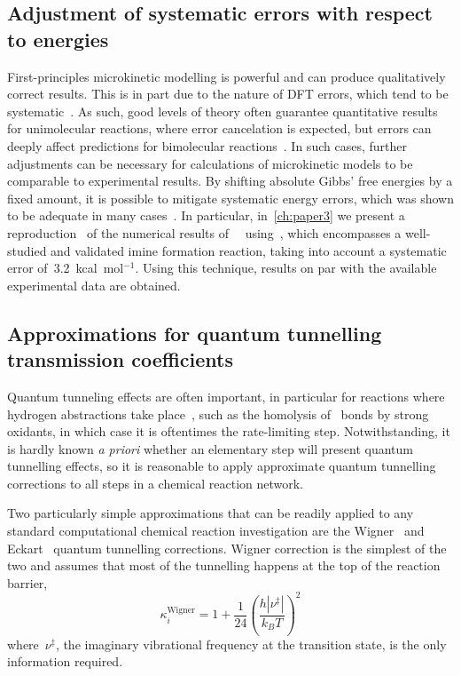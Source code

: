 \subsection{Adjustment of systematic errors with respect to energies}%
\label{sec:rates-error-prop-adj}

First-principles microkinetic modelling is powerful and can produce qualitatively correct results.
This is in part due to the nature of DFT errors,
which tend to be systematic~\cite{P_rez_Soto_2020}.
As such,
good levels of theory often guarantee quantitative results for unimolecular reactions,
where error cancelation is expected,
but errors can deeply affect predictions for bimolecular reactions~\cite{P_rez_Soto_2020}.
In such cases,
further adjustments can be necessary for calculations of microkinetic models to be comparable to experimental results.
By shifting absolute Gibbs' free energies by a fixed amount,
it is possible to mitigate systematic energy errors,
which was shown to be adequate in many cases~\cite{Ahn_2019,P_rez_Soto_2020}.
In particular,
in~\cref{ch:paper3} we present a reproduction~\cite{Schneider_2022} of the numerical results
of~\citeauthor{P_rez_Soto_2020}~\cite{P_rez_Soto_2020} using~\overreact{},
which encompasses a well-studied and validated imine formation reaction,
taking into account a systematic error of~3.2~kcal~mol$^{-1}$.
Using this technique,
results on par with the available experimental data are obtained.

\subsection{Approximations for quantum tunnelling transmission coefficients}%
\label{sec:tunneling}

Quantum tunneling effects are often important,
in particular for reactions where
hydrogen abstractions take place~\cite{Bim2018},
such as the homolysis of~ bonds by strong
oxidants,
in which case it is oftentimes the rate-limiting step.
Notwithstanding,
it is hardly known \emph{a priori} whether an elementary step
will present quantum tunnelling effects,
so it is reasonable to apply approximate quantum tunnelling corrections to all steps in a chemical reaction network.

Two particularly simple approximations that can be readily applied to any standard computational chemical reaction investigation
are the Wigner~\cite{Wigner_1932} and Eckart~\cite{Eckart_1930} quantum tunnelling corrections.
Wigner correction is the simplest of the two and assumes that most of the tunnelling happens at the top of the reaction barrier,
% 
\begin{equation}
	\kappa_i^\text{Wigner}
	= 1 + \frac{1}{24}
	\left(
	\frac{
		h | \nu^\ddagger |
	}{k_B T}
	\right)^2
\end{equation}
% 
where~$\nu^\ddagger$,
the imaginary vibrational frequency at the transition state,
is the only information required.

